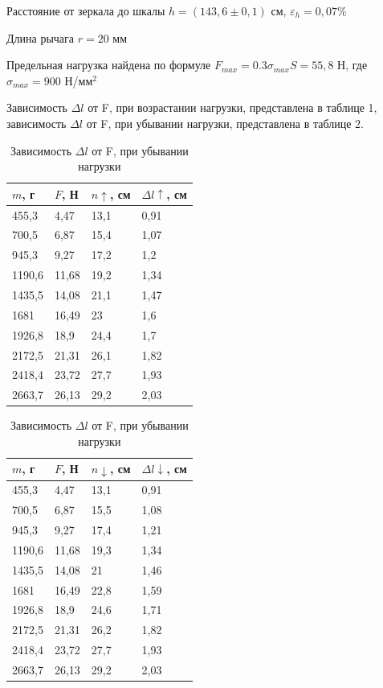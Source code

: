 \documentclass[a4paper, 12pt]{article}
\begin{document}
Расстояние от зеркала до шкалы $h = (143,6 \pm 0,1)$ см, $\varepsilon_h = 0,07\%$

Длина рычага $r = 20$ мм

Предельная нагрузка найдена по формуле $F_{max} = 0.3\sigma_{max} S = 55,8$ Н, где $\sigma_{max} = 900$ Н/мм$^2$

Зависимость $\Delta l$ от F, при возрастании нагрузки, представлена в таблице 1, зависимость $\Delta l$ от F, при убывании нагрузки, представлена в таблице 2.

\begin{table}[ht]
 \centering
    \parbox{.4 \textwidth}{
        \centering
        \begin{tabular}{|l|l|l|l|}
        \hline
            $m$, г & $F$, Н & $n\uparrow$, см & $\Delta l\uparrow$, см \\ \hline
            455,3 & 4,47 & 13,1 & 0,91 \\ \hline
            700,5 & 6,87 & 15,4 & 1,07 \\ \hline
            945,3 & 9,27 & 17,2 & 1,2 \\ \hline
            1190,6 & 11,68 & 19,2 & 1,34 \\ \hline
            1435,5 & 14,08 & 21,1 & 1,47 \\ \hline
            1681 & 16,49 & 23 & 1,6 \\ \hline
            1926,8 & 18,9 & 24,4 & 1,7 \\ \hline
            2172,5 & 21,31 & 26,1 & 1,82 \\ \hline
            2418,4 & 23,72 & 27,7 & 1,93 \\ \hline
            2663,7 & 26,13 & 29,2 & 2,03 \\ \hline
        \end{tabular}
        \caption{Зависимость $\Delta l$ от F, при возрастании нагрузки}
        \label{tab:1}
    }
    \hfill
    \parbox{.5 \textwidth}{
        \centering
        \begin{tabular}{|l|l|l|l|}
        \hline
            $m$, г & $F$, Н & $n\downarrow$, см & $\Delta l\downarrow$, см \\ \hline
            455,3 & 4,47 & 13,1 & 0,91 \\ \hline
            700,5 & 6,87 & 15,5 & 1,08 \\ \hline
            945,3 & 9,27 & 17,4 & 1,21 \\ \hline
            1190,6 & 11,68 & 19,3 & 1,34 \\ \hline
            1435,5 & 14,08 & 21 & 1,46 \\ \hline
            1681 & 16,49 & 22,8 & 1,59 \\ \hline
            1926,8 & 18,9 & 24,6 & 1,71 \\ \hline
            2172,5 & 21,31 & 26,2 & 1,82 \\ \hline
            2418,4 & 23,72 & 27,7 & 1,93 \\ \hline
            2663,7 & 26,13 & 29,2 & 2,03 \\ \hline
        \end{tabular}
        \caption{Зависимость $\Delta l$ от F, при убывании нагрузки}
        \label{tab:2}
    }
 \end{table}
\end{document}
